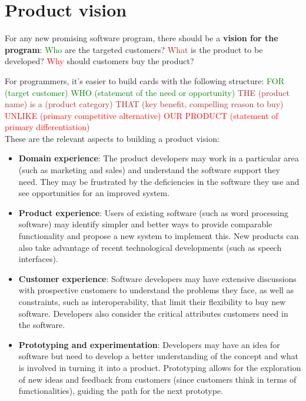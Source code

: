 \section{Product vision}

For any new promising software program, there should be a \textbf{vision for the program}: \textcolor{green}{Who} are the targeted customers? \textcolor{brown}{What} is the product to be developed? \textcolor{red}{Why} should customers buy the product?

\noindent For programmers, it's easier to build cards with the following structure:
\newline \noindent \textcolor{green}{FOR (target customer)} \textcolor{green}{WHO (statement of the need or opportunity)}
\newline \noindent \textcolor{brown}{THE (product name) is a (product category)} \textcolor{brown}{THAT (key benefit, compelling reason to buy)}
\newline \noindent \textcolor{red}{UNLIKE (primary competitive alternative)} \textcolor{red}{OUR PRODUCT (statement of primary differentiation)}\\

These are the relevant aspects to building a product vision:
\begin{itemize}
    \item \textbf{Domain experience}: The product developers may work in a particular area (such as marketing and sales) and understand the software support they need. They may be frustrated by the deficiencies in the software they use and see opportunities for an improved system.
    \item \textbf{Product experience}: Users of existing software (such as word processing software) may identify simpler and better ways to provide comparable functionality and propose a new system to implement this. New products can also take advantage of recent technological developments (such as speech interfaces).
    \item \textbf{Customer experience}: Software developers may have extensive discussions with prospective customers to understand the problems they face, as well as constraints, such as interoperability, that limit their flexibility to buy new software. Developers also consider the critical attributes customers need in the software.
    \item \textbf{Prototyping and experimentation}: Developers may have an idea for software but need to develop a better understanding of the concept and what is involved in turning it into a product. Prototyping allows for the exploration of new ideas and feedback from customers (since customers think in terms of functionalities), guiding the path for the next prototype.
\end{itemize}

